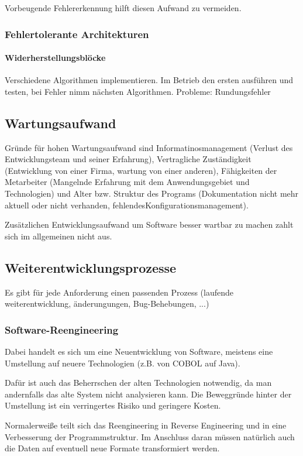 Vorbeugende Fehlererkennung hilft diesen Aufwand zu vermeiden.

\subsubsection{Fehlertolerante Architekturen}
\paragraph{Widerherstellungsblöcke}
Verschiedene Algorithmen implementieren. Im Betrieb den ersten ausführen und testen, bei Fehler nimm nächsten Algorithmen. Probleme: Rundungsfehler

\subsection{Wartungsaufwand}
Gründe für hohen Wartungsaufwand sind Informatinosmanagement (Verlust des Entwicklungsteam und seiner Erfahrung), Vertragliche Zuständigkeit (Entwicklung von einer Firma, wartung von einer anderen), Fähigkeiten der Metarbeiter (Mangelnde Erfahrung mit dem Anwendungsgebiet und Technologien) und Alter bzw. Struktur des Programs (Dokumentation nicht mehr aktuell oder nicht verhanden, fehlendesKonfigurationsmanagement).

Zusätzlichen Entwicklungsaufwand um Software besser wartbar zu machen zahlt sich im allgemeinen nicht aus. 

\subsection{Weiterentwicklungsprozesse}
Es gibt für jede Anforderung einen passenden Prozess (laufende weiterentwicklung, änderungungen, Bug-Behebungen, ...)

\subsubsection{Software-Reengineering}
Dabei handelt es sich um eine Neuentwicklung von Software, meistens eine Umstellung auf neuere Technologien (z.B. von COBOL auf Java).

Dafür ist auch das Beherrschen der alten Technologien notwendig, da man andernfalls das alte System nicht analysieren kann. Die Beweggründe hinter der Umstellung ist ein verringertes Risiko und geringere Kosten.

Normalerweiße teilt sich das Reengineering in Reverse Engineering und in eine Verbesserung der Programmstruktur. Im Anschluss daran müssen natürlich auch die Daten auf eventuell neue Formate transformiert werden.

